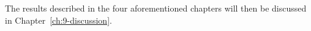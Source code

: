 The results described in the four aforementioned chapters will then be discussed in Chapter~\ref{ch:9-discussion}.



